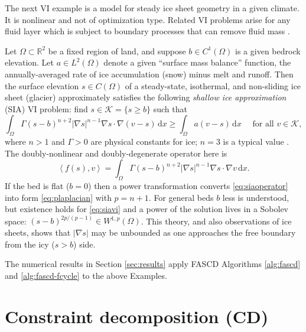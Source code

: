\documentclass[review,hidelinks,onefignum,onetabnum]{siamart220329}
\newcommand{\RR}{\mathbb{R}}
\newcommand{\grad}{\nabla}
\newcommand{\ip}[2]{\left<#1,#2\right>}
\newcommand{\dx}{\, \mathrm{d}x}
\begin{document}
The next VI example is a model for steady ice sheet geometry in a given climate. It is nonlinear and not of optimization type. Related VI problems arise for any fluid layer which is subject to boundary processes that can remove fluid mass \cite{Bueler2021conservation}.

\begin{example}  \label{ex:sia}  Let $\Omega \subset \RR^2$ be a fixed region of land, and suppose $b \in C^1(\Omega)$ is a given bedrock elevation.  Let $a \in L^2(\Omega)$ denote a given ``surface mass balance'' function, the annually-averaged rate of ice accumulation (snow) minus melt and runoff.  Then the surface elevation $s\in C(\Omega)$ of a steady-state, isothermal, and non-sliding ice sheet (glacier) approximately satisfies the following \emph{shallow ice approximation} (SIA) \cite{GreveBlatter2009} VI problem: find $s \in \mathcal{K} = \{s\ge b\}$ such that
\begin{equation}
\int_\Omega \Gamma (s-b)^{n+2} |\grad s|^{n-1} \grad s \cdot \grad (v-s) \dx \ge \int_\Omega a (v-s)\dx \quad \text{ for all } v \in \mathcal{K}, \label{eq:siavi}
\end{equation}
where $n>1$ and $\Gamma>0$ are physical constants for ice; $n=3$ is a typical value \cite{GreveBlatter2009}.  The doubly-nonlinear and doubly-degenerate operator here is
\begin{equation}
\ip{f(s)}{v} = \int_\Omega \Gamma (s-b)^{n+2} |\grad s|^{n-1} \grad s \cdot \grad v\dx. \label{eq:siaoperator}
\end{equation}
If the bed is flat ($b=0$) then a power transformation converts \eqref{eq:siaoperator} into form \eqref{eq:plaplacian} with $p=n+1$.  For general beds $b$ less is understood, but existence holds for \eqref{eq:siavi} \cite{JouvetBueler2012} and a power of the solution lives in a Sobolev space: $(s-b)^{2p/(p-1)} \in W^{1,p}(\Omega)$.  This theory, and also observations of ice sheets, shows that $|\grad s|$ may be unbounded as one approaches the free boundary from the icy ($s>b$) side.
\end{example}

The numerical results in Section \ref{sec:results} apply FASCD Algorithms \ref{alg:fascd} and \ref{alg:fascd-fcycle} to the above Examples.


\section{Constraint decomposition (CD)} \label{sec:cd}
\end{document}
